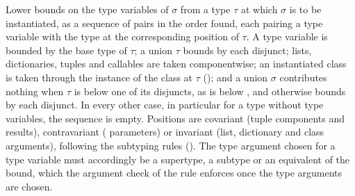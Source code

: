 Lower bounds on the type variables of $\sigma$ from a type $\tau$ at which $\sigma$ is to be instantiated, as a
sequence of pairs in the order found, each pairing a type variable with the type at the corresponding position of
$\tau$. A type variable is bounded by the base type of $\tau$; a union $\tau$ bounds by each disjunct; lists, dictionaries,
tuples and callables are taken componentwise; an instantiated class is taken through the instance of the class at
$\tau$ (); and a union $\sigma$ contributes nothing when $\tau$ is below one of its disjuncts, as
 is below , and otherwise bounds by each disjunct. In every other case, in particular for a type without type variables, the sequence
is empty. Positions are covariant (tuple components and  results), contravariant
( parameters) or invariant (list, dictionary and class arguments), following the subtyping rules
(). The type argument chosen for a type variable must accordingly be a supertype, a subtype or an
equivalent of the bound, which the argument check of the  rule enforces once the type arguments are
chosen.
